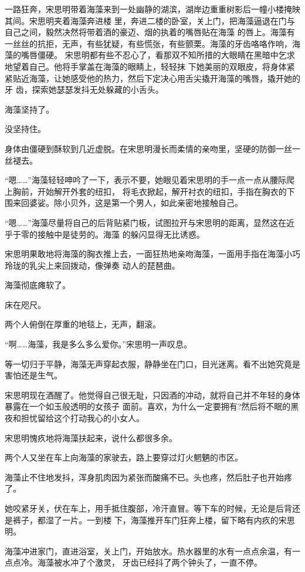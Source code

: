\documentclass[11pt,a4paper,onecolumn]{article}
\begin{document}
一路狂奔，宋思明带着海藻来到一处幽静的湖滨，湖岸边重重树影后一幢小楼掩映其间。宋思明夹着海藻奔进楼
里，奔进二楼的卧室，关上门，把海藻逼退在门与自己之间，毅然决然将带着酒的豪迈、烟的执着的嘴唇贴在海藻
的唇上。海藻有一丝丝的抗拒，无声，有些犹疑，有些慌张，有些颤栗。海藻的牙齿咯咯作响，海藻的嘴唇僵硬。
宋思明都有些不忍心了，看那双不知所措的大眼睛在黑暗中乞求地望着自己。他将手掌盖在海藻的眼睛上，轻轻抹
下她美丽的双眼皮，将身体紧紧贴近海藻，让她感受他的热力，然后下定决心用舌尖撬开海藻的嘴唇，撬开她的牙
齿，探索她瑟瑟发抖无处躲藏的小舌头。

海藻坚持了。

没坚持住。

身体由僵硬到酥软到几近虚脱。在宋思明漫长而柔情的亲吻里，坚硬的防御一丝一丝褪去。

``嗯……''海藻轻轻呻吟了一下，表示不要，她眼见着宋思明的手一点一点从腰际爬上胸前，开始解开外套的纽扣，
将毛衣掀起，解开衬衣的纽扣，手指在胸衣的下围来回婆娑。除小贝外，这是第一个男人，如此亲密地接触自己。

``嗯……''海藻尽量将自己的后背贴紧门板，试图拉开与宋思明的距离，显然这在近乎于零的接触中是徒劳的。海藻
的躲闪显得无比诱惑。

宋思明果敢地将海藻的胸衣推上去，一面狂热地亲吻海藻，一面用手指在海藻小巧玲珑的乳尖上来回拨动，像弹奏
动人的琵琶曲。

海藻彻底瘫软了。

床在咫尺。

两个人俯倒在厚重的地毯上，无声，翻滚。

``啊……海藻，我是多么多么爱你。''宋思明一声叹息。

等一切归于平静，海藻无声穿起衣服，静静坐在门口，目光迷离。看不出她究竟是害怕还是生气。

宋思明现在酒醒了。他觉得自己很无耻，只因酒的冲动，就将自己并不年轻的身体暴露在一个如玉般透明的女孩子
面前。喜欢，为什么一定要拥有?然后将不眠的黑夜和担忧留给这个打动我心的小女人。

宋思明愧疚地将海藻扶起来，说什么都很多余。

两个人又坐在车上向海藻的家驶去，路上要穿过灯火魍魉的市区。

海藻止不住地发抖，浑身肌肉因为紧张而酸痛不已。头也疼，然后肚子也开始疼了。

她咬紧牙关，伏在车上，用手抵住腹部，冷汗直冒。等下车的时候，无论是后背还是裤子，都湿了一片。一到楼
下，海藻推开车门狂奔上楼，留下略有内疚的宋思明。

海藻冲进家门，直进浴室，关上门，开始放水。热水器里的水有一点点余温，有一点点冷。海藻被水冲了个激灵，
牙齿已经抖了两个钟头了，一直不停。
\end{document}
